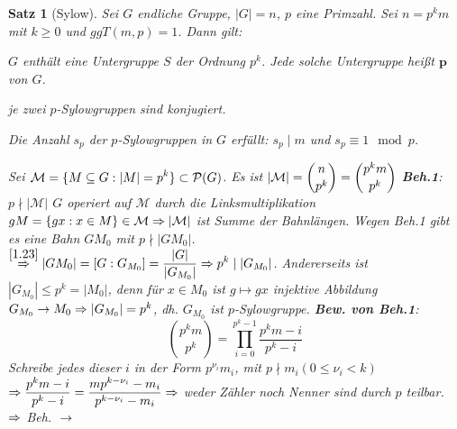 \documentclass[a4paper,10pt,german]{scrbook}
\theoremstyle{saetze}
\newtheorem{Satz}{Satz}
\theoremstyle{definitionen}
\begin{document}
\begin{Satz}[Sylow]
    Sei $G$ endliche Gruppe, $|G| = n$, $p$ eine Primzahl. Sei $n = p^k m$ mit
    $k \geq 0$ und $ggT(m,p) = 1$. Dann gilt:
    
    \begin{enum}
        \item $G$ enthält eine Untergruppe $S$ der Ordnung $p^k$. Jede solche 
        Untergruppe heißt $\mathbf{p}$ von $G$.
        
        \item je zwei $p$-Sylowgruppen sind konjugiert.

        \item Die Anzahl $s_p$ der $p$-Sylowgruppen in $G$ erfüllt: $s_p \mid m$ und
        $s_p \equiv 1 \mod p$.
    \end{enum}

    {
        \item Sei $\displaystyle\mathcal{M} = \{ M \subseteq G: |M| = p^k\} \subset 
        \mathcal{P}(G)$. \newline Es ist $\displaystyle|\mathcal{M}| = \binom{n}{p^k} = \binom{p^k
        m}{p^k}$ \newline
        \textbf{Beh.1}:
            $p \nmid |\mathcal{M}|$ \newline
        $G$ operiert auf $\mathcal{M}$ durch die Linksmultiplikation $gM = 
        \{ gx : x \in M\} \in \mathcal{M} \Rightarrow |\mathcal{M}|$ ist 
        Summe der Bahnlängen. Wegen Beh.1 gibt es eine Bahn $G M_0$ mit $p \nmid
        |G M_0|$. \newline $\displaystyle \overset{\ref{1.23}}{\Rightarrow} |G M_0|
        =[G:G_{M_0}] = \frac{|G|}{|G_{M_0}|} \Rightarrow p^k \mid |G_{M_0}|$.\newline
        Andererseits ist $|G_{M_0}| \leq p^k = |M_0|$, denn für $x \in M_0$ ist
        $g\mapsto gx$ injektive Abbildung $G_{M_0} \rightarrow M_0 \Rightarrow |G_{M_0}| = p^k$,
        dh. $G_{M_0}$ ist $p$-Sylowgruppe. \newline
        \textbf{Bew. von Beh.1}:
            \[ \binom{p^k m}{p^k} = \prod_{i=0}^{p^k-1} \frac{p^k m - i}{p^k
            -i}\] Schreibe jedes dieser $i$ in der Form $p^{\nu_i} m_i$, mit $p
            \nmid m_i (0\leq \nu_i < k)$ $\displaystyle \Rightarrow \frac{p^k m - i}{p^k
            - i} = \frac{m p^{k-\nu_i} - m_i}{p^{k-\nu_i} - m_i} \Rightarrow$ weder
            Zähler noch Nenner sind durch $p$ teilbar. $\Rightarrow$ Beh. $\\\rightarrow$
    }


\end{Satz}
\end{document}
